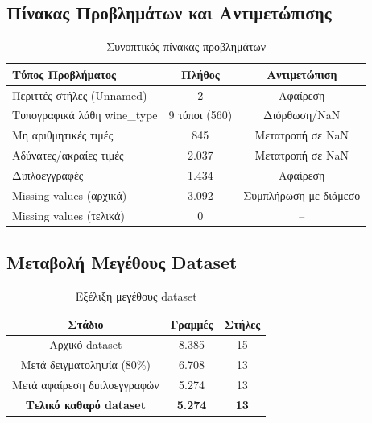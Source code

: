 \documentclass[12pt,a4paper]{article}
\begin{document}
\subsection{\textgreek{Πίνακας Προβλημάτων και Αντιμετώπισης}}

\begin{table}[H]
\centering
\caption{\textgreek{Συνοπτικός πίνακας προβλημάτων}}
\label{tab:summary}
\begin{tabular}{@{}lcc@{}}
\toprule
\textbf{\textgreek{Τύπος Προβλήματος}} & \textbf{\textgreek{Πλήθος}} & \textbf{\textgreek{Αντιμετώπιση}} \\
\midrule
\textgreek{Περιττές στήλες (Unnamed)} & 2 & \textgreek{Αφαίρεση} \\
\textgreek{Τυπογραφικά λάθη wine\_type} & 9 \textgreek{τύποι (560)} & \textgreek{Διόρθωση/NaN} \\
\textgreek{Μη αριθμητικές τιμές} & 845 & \textgreek{Μετατροπή σε NaN} \\
\textgreek{Αδύνατες/ακραίες τιμές} & 2.037 & \textgreek{Μετατροπή σε NaN} \\
\textgreek{Διπλοεγγραφές} & 1.434 & \textgreek{Αφαίρεση} \\
Missing values (\textgreek{αρχικά}) & 3.092 & \textgreek{Συμπλήρωση με διάμεσο} \\
Missing values (\textgreek{τελικά}) & 0 & -- \\
\bottomrule
\end{tabular}
\end{table}

\subsection{\textgreek{Μεταβολή Μεγέθους Dataset}}

\begin{table}[H]
\centering
\caption{\textgreek{Εξέλιξη μεγέθους dataset}}
\begin{tabular}{|c|c|c|}
\hline
\textbf{\textgreek{Στάδιο}} & \textbf{\textgreek{Γραμμές}} & \textbf{\textgreek{Στήλες}} \\
\hline
\textgreek{Αρχικό dataset} & 8.385 & 15 \\
\hline
\textgreek{Μετά δειγματοληψία (80\%)} & 6.708 & 13 \\
\hline
\textgreek{Μετά αφαίρεση διπλοεγγραφών} & 5.274 & 13 \\
\hline
\textbf{\textgreek{Τελικό καθαρό dataset}} & \textbf{5.274} & \textbf{13} \\
\hline
\end{tabular}
\end{table}
\end{document}

